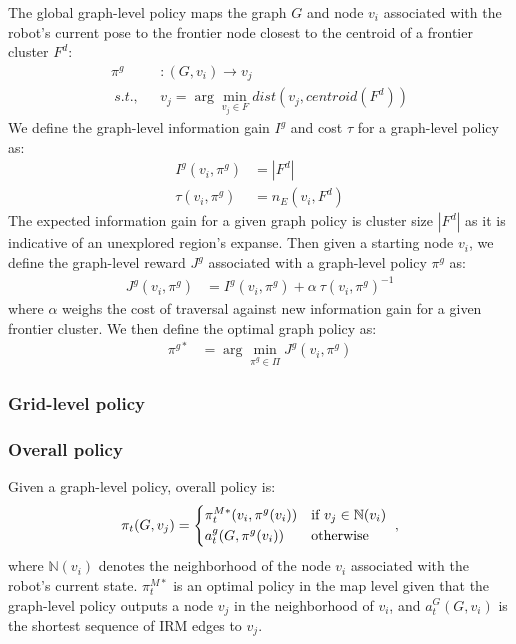 \documentclass[letterpaper, 10 pt, conference]{ieeeconf}  %
\begin{document}
The global graph-level policy maps the graph $G$ and node $v_i$ associated with the robot's current pose to the frontier node closest to the centroid of a frontier cluster $F^d$:
\begin{align}
  \pi^g&: (G,v_i) \rightarrow v_{j} \nonumber \\
  ~s.t.,~~~ &v_j= \arg\min_{v_j \in F} dist(v_{j}, centroid(F^d))
\end{align}
We define the graph-level information gain $I^g$ and cost $\tau$ for a graph-level policy as:
\begin{align}
    I^g(v_i,\pi^g) &= |F^d| \nonumber \\
    \tau(v_i,\pi^g) &= n_E(v_i,F^d) 
\end{align}
The expected information gain for a given graph policy is cluster size $|F^d|$ as it is indicative of an unexplored region's expanse. Then given a starting node $v_i$, we define the graph-level reward $J^g$ associated with a graph-level policy $\pi^g$ as: 
\begin{align}
    J^{g}(v_i, \pi^g) &= I^g(v_i,\pi^g) + \alpha~\tau(v_i,\pi^g)^{-1}
\end{align}
where $\alpha$ weighs the cost of traversal against new information gain for a given frontier cluster. We then define the optimal graph policy as:
\begin{align}
    \pi^{g*} &= \arg\min_{\pi^g \in \Pi} J^{g}(v_i, \pi^g) \nonumber
\end{align}

\subsubsection{Grid-level policy}

\subsubsection{Overall policy}
Given a graph-level policy, overall policy is:
\begin{align}
  \pi_t(G, v_j) = 
  \begin{dcases*}
    \pi_t^{M*}(v_i, \pi^g(v_i)) & if $v_j \in \mathbb{N}(v_i)$ \\
    a_t^g(G, \pi^g(v_i)) & otherwise 
  \end{dcases*},
\end{align}
where $\mathbb{N}(v_i)$ denotes the neighborhood of the node $v_i$ associated with the robot's current state. $\pi_t^{M*}$ is an optimal policy in the map level given that the graph-level policy outputs a node $v_j$ in the neighborhood of $v_i$, and $a_t^G(G, v_i)$ is the shortest sequence of IRM edges to $v_j$.
\end{document}
